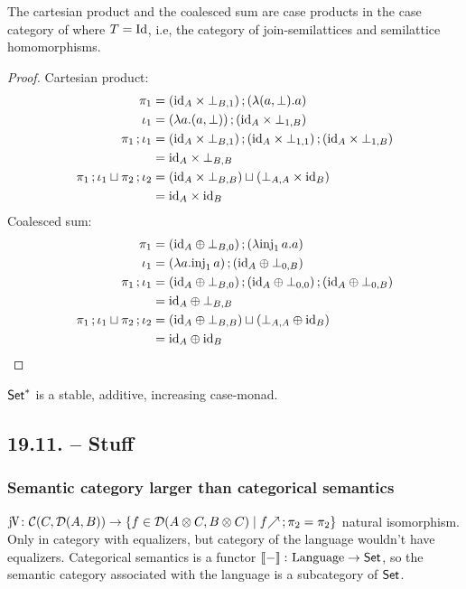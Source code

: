 \documentclass[runningheads,envcountsame]{llncs}
\begin{document}
\begin{lemma}
    The cartesian product and the coalesced sum are case products in the case category of  where $T=\Id$, i.e, the category of join-semilattices and semilattice homomorphisms.
\end{lemma}
\begin{proof}
    Cartesian product:
    \begin{align}
        \pi_1 &= \comp{(\id_A \times \bot_{B, 1})}{(\lambda (a, \bot). a)} \\
        \iota_1 &= \comp{(\lambda a. (a, \bot))}{(\id_A \times \bot_{1, B})} \\
        \comp{\pi_1}{\iota_1} &= \comp{\comp{(\id_A \times \bot_{B, 1})}{(\id_A \times \bot_{1, 1})}}{(\id_A \times \bot_{1, B})} \\
            &= \id_A \times \bot_{B, B} \\
        \comp{\pi_1}{\iota_1} \sqcup \comp{\pi_2}{\iota_2} &= (\id_A \times \bot_{B, B}) \sqcup (\bot_{A, A} \times \id_B) \\
            &= \id_A \times \id_B
    \end{align}
    Coalesced sum:
    \begin{align}
        \pi_1 &= \comp{(\id_A \oplus \bot_{B, 0})}{(\lambda \inj_1\,a. a)} \\
        \iota_1 &= \comp{(\lambda a. \inj_1\,a)}{(\id_A \oplus \bot_{0, B})} \\
        \comp{\pi_1}{\iota_1} &= \comp{\comp{(\id_A \oplus \bot_{B, 0})}{(\id_A \oplus \bot_{0, 0})}}{(\id_A \oplus \bot_{0, B})} \\
            &= \id_A \oplus \bot_{B, B} \\
        \comp{\pi_1}{\iota_1} \sqcup \comp{\pi_2}{\iota_2} &= (\id_A \oplus \bot_{B, B}) \sqcup (\bot_{A, A} \oplus \id_B) \\
            &= \id_A \oplus \id_B
    \end{align}
\end{proof}

\begin{lemma}
    $\mathsf{Set}^*$ is a stable, additive, increasing case-monad.
\end{lemma}

\subsection{19.11. -- Stuff}

\subsubsection{Semantic category larger than categorical semantics}
$\juncurry\colon \homC{C}{\homD{A}{B}} \to \{ f \in \homD{\tensor{A}{C}}{\tensor{B}{C}} \mid \comp{\f{f}}{\pi_2} = \pi_2 \}$ natural isomorphism. Only in category with equalizers, but category of the language wouldn't have equalizers. Categorical semantics is a functor $\sem{-}\colon \text{Language} \to \Set$, so the semantic category associated with the language is a subcategory of $\mathsf{Set}$.
\end{document}
